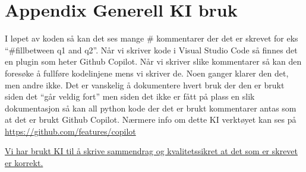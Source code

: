 \documentclass[
  12pt,
  a4paper,
  DIV=11,
  numbers=noendperiod]{scrartcl}
\begin{document}
\clearpage

\appendix

\section {Appendix Generell KI bruk}

I løpet av koden så kan det ses mange \# kommentarer der det er skrevet
for eks ``\#fillbetween q1 and q2''. Når vi skriver kode i Visual Studio
Code så finnes det en plugin som heter Github Copilot. Når vi skriver
slike kommentarer så kan den foresøke å fullføre kodelinjene mens vi
skriver de. Noen ganger klarer den det, men andre ikke. Det er vanskelig
å dokumentere hvert bruk der den er brukt siden det ``går veldig fort''
men siden det ikke er fått på plass en slik dokumentasjon så kan all
python kode der det er brukt kommentarer antas som at det er brukt
Github Copilot. Nærmere info om dette KI verktøyet kan ses på
\url{https://github.com/features/copilot}

\href{https://chat.openai.com/share/7251a149-e74a-4599-a550-3f3e95aec068}{Vi
har brukt KI til å skrive sammendrag og kvalitetssikret at det som er
skrevet er korrekt.}
\end{document}
